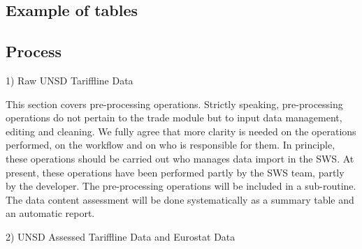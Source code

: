\documentclass[nojss]{jss}\usepackage[]{graphicx}\usepackage[]{color}
\begin{document}
\subsection{Example of tables}





\subsection{Process}

1)	Raw UNSD Tariffline Data

This section covers pre-processing operations. Strictly speaking, pre-processing operations do not pertain to the trade module but to input data management, editing and cleaning.
We fully agree that more clarity is needed on the operations performed, on the workflow and on who is responsible for them.
In principle, these operations should be carried out who manages data import in the SWS. At present, these operations have been performed partly by the SWS team, partly by the developer.
The pre-processing operations will be included in a sub-routine.
The data content assessment will be done systematically as a summary table and an automatic report.

2)	UNSD Assessed Tariffline Data and Eurostat Data
\end{document}

